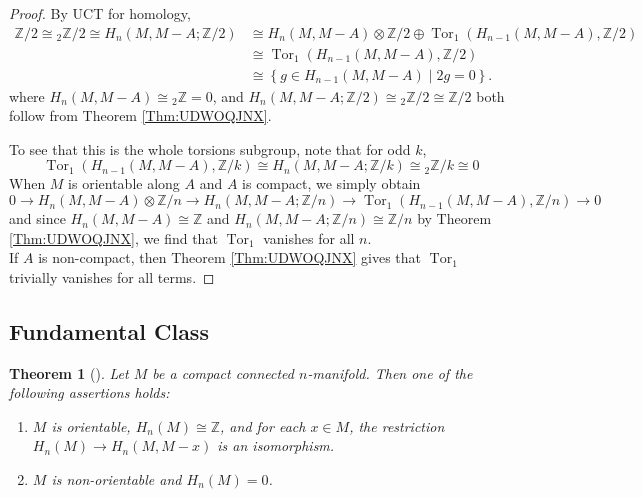 \documentclass[reqno]{amsart}
\newtheorem{theorem}{Theorem}[section]
\theoremstyle{definition}
\theoremstyle{remark}
\DeclareMathOperator{\Tor}{Tor}
\begin{document}
\begin{proof}
    By UCT for homology,
    \begin{align*}
       \mathbb{Z}/2
       \cong {}_{2} \mathbb{Z}/2 \cong H_n(M, M-A; \mathbb{Z}/2) 
       &\cong
        H_n (M, M-A) \otimes \mathbb{Z}/2 \oplus
        \Tor_1 \left( H_{n-1}(M,M-A), \mathbb{Z}/2 \right) \\
        &\cong \Tor_1 \left( H_{n-1}(M,M-A) , \mathbb{Z}/2 \right)\\
        &\cong \left\{ 
        g \in H_{n-1}(M, M-A)  \mid 2g = 0 \right\} .
    \end{align*}
    where $H_n \left( M, M-A \right) \cong
    {}_{2}\mathbb{Z} = 0$, and
    $H_n\left( M, M-A; \mathbb{Z}/2 \right) \cong
    {}_{2}\mathbb{Z}/2 \cong \mathbb{Z}/2$ both follow
    from Theorem \ref{Thm:UDWOQJNX}.

    To see that this is the whole torsions subgroup, note
    that for odd $k$,
    \[
    \Tor_1 \left( H_{n-1}(M,M-A) , \mathbb{Z}/k \right) 
    \cong H_n (M, M-A; \mathbb{Z}/k) \cong
    {}_{2}\mathbb{Z}/k \cong 0
    \] 
    When $M$ is orientable along $A$ and $A$ is compact, 
    we simply obtain
    \[
    0 \to H_n (M, M-A) \otimes \mathbb{Z}/n
    \to H_{n}(M, M-A; \mathbb{Z}/n) \to 
    \Tor_1 \left( H_{n-1}(M, M-A), \mathbb{Z}/n \right) \to 0
    \] 
    and since $H_n(M,M-A) \cong \mathbb{Z}$ and
    $H_{n}\left( M, M-A; \mathbb{Z}/n \right) \cong \mathbb{Z}/n$ 
    by Theorem \ref{Thm:UDWOQJNX}, we find that
    $\Tor_1$ vanishes for all $n$.\\
    If  $A$ is non-compact, then Theorem \ref{Thm:UDWOQJNX}
    gives that $\Tor_1$ trivially vanishes
    for all terms.
    
\end{proof}

\subsection{Fundamental Class}

\begin{theorem}[]\label{Thm:IXKEK}
    Let $M$ be a compact connected $n$-manifold. Then
    one of the following assertions holds:
    \begin{enumerate}
        \item $M$ is orientable, $H_n (M) \cong \mathbb{Z}$, and
            for each $x \in M$, the restriction
            $H_n(M) \to H_n(M, M-x)$ is an isomorphism.
        \item $M$ is non-orientable and
            $H_n(M) = 0$.
    \end{enumerate}
\end{theorem}
\end{document}
